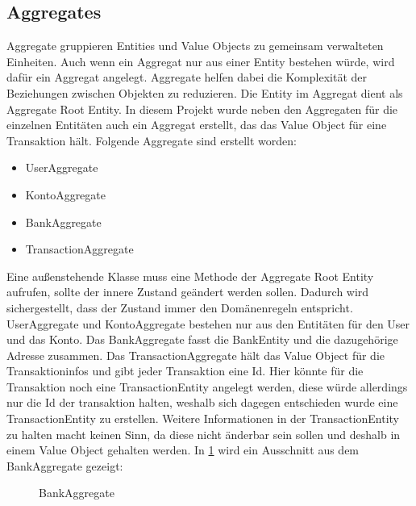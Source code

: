 \subsection{Aggregates}
Aggregate gruppieren Entities und Value Objects zu gemeinsam verwalteten Einheiten. Auch wenn ein Aggregat nur aus einer Entity bestehen würde, wird dafür ein Aggregat angelegt. 
Aggregate helfen dabei die Komplexität der Beziehungen zwischen Objekten zu reduzieren. Die Entity im Aggregat dient als Aggregate Root Entity.
\newline In diesem Projekt wurde neben den Aggregaten für die einzelnen Entitäten auch ein Aggregat erstellt, das das Value Object für eine Transaktion hält. Folgende Aggregate sind 
erstellt worden:
\begin{itemize}
    \item UserAggregate
    \item KontoAggregate
    \item BankAggregate
    \item TransactionAggregate
\end{itemize}
Eine außenstehende Klasse muss eine Methode der Aggregate Root Entity aufrufen, sollte der innere Zustand geändert werden sollen. Dadurch wird sichergestellt, dass der Zustand immer den Domänenregeln entspricht.
\newline UserAggregate und KontoAggregate bestehen nur aus den Entitäten für den User und das Konto. Das BankAggregate fasst die BankEntity und die dazugehörige Adresse zusammen. Das TransactionAggregate hält das Value Object 
für die Transaktioninfos und gibt jeder Transaktion eine Id. Hier könnte für die Transaktion noch eine TransactionEntity angelegt werden, diese würde allerdings nur die Id der transaktion halten, weshalb sich dagegen entschieden wurde eine TransactionEntity zu erstellen. 
Weitere Informationen in der TransactionEntity zu halten macht keinen Sinn, da diese nicht änderbar sein sollen und deshalb in einem Value Object gehalten werden.
\newline In \ref{bankAgg} wird ein Ausschnitt aus dem BankAggregate gezeigt:
\begin{figure}[htbp]
    \centering
    \caption{\label{bankAgg} BankAggregate}
\end{figure}
